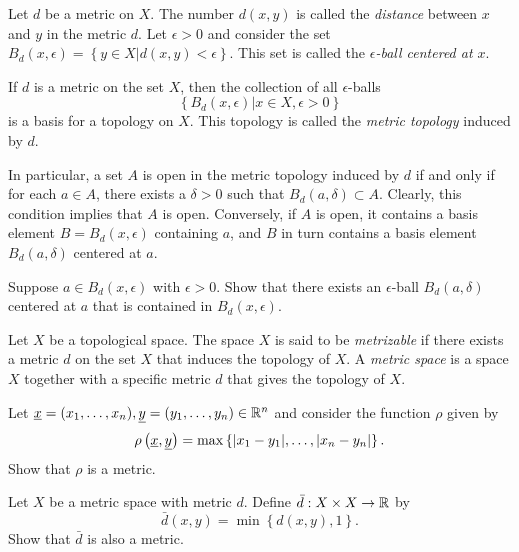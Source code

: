 Let $d$ be a metric on $X$.
The number $d(x,y)$ is called the \emph{distance} between $x$ and $y$ in the metric $d$.
Let $\epsilon > 0$ and consider the set $B_d(x,\epsilon) = \left\{ y \in X | d(x,y) < \epsilon \right\}$.
This set is called the \emph{$\epsilon$-ball centered at $x$}.

\begin{definition}
If $d$ is a metric on the set $X$, then the collection of all $\epsilon$-balls
\begin{equation*}
\left\{ B_d (x, \epsilon) |  x \in X, \epsilon > 0 \right\}
\end{equation*}
is a basis for a topology on $X$.
This topology is called the \emph{metric topology} induced by $d$.
\end{definition}

In particular, a set $A$ is open in the metric topology induced by $d$ if and only if for each $a \in A$, there exists a $\delta > 0$ such that $B_d (a, \delta) \subset A$.
Clearly, this condition implies that $A$ is open.
Conversely, if $A$ is open, it contains a basis element $B = B_d (x, \epsilon)$ containing $a$, and $B$ in turn contains a basis element $B_d (a, \delta)$ centered at $a$.

\begin{problem}
Suppose $a \in B_d(x, \epsilon)$ with $\epsilon > 0$.
Show that there exists an $\epsilon$-ball $B_d(a, \delta)$ centered at $a$ that is contained in $B_d(x, \epsilon)$.
\end{problem}

\begin{definition}
Let $X$ be a topological space.
The space $X$ is said to be \emph{metrizable} if there exists a metric $d$ on the set $X$ that induces the topology of $X$.
A \emph{metric space} is a space $X$ together with a specific metric $d$ that gives the topology of $X$.
\end{definition}

\begin{problem}
Let $\underline{x} = (x_1, \ldots, x_n), \underline{y} = (y_1, \ldots, y_n) \in \mathbb{R}^n$ and consider the function $\rho$ given by
\begin{equation*}
\rho \left( \underline{x}, \underline{y} \right)
= \max \left\{ |x_1 - y_1|, \ldots, |x_n - y_n| \right\}.
\end{equation*}
Show that $\rho$ is a metric.
\end{problem}

\begin{problem} \label{problem:StandardBoundedMetric}
Let $X$ be a metric space with metric $d$.
Define $\bar{d} : X \times X \rightarrow \mathbb{R}$ by
\begin{equation*}
\bar{d} (x, y)
= \min \left\{ d (x, y), 1 \right\}.
\end{equation*}
Show that $\bar{d}$ is also a metric.
\end{problem}


